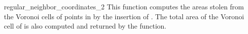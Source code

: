 \begin{ccRefFunction}{regular_neighbor_coordinates_2}
\ccImplementation This function computes the areas stolen from the
Voronoi cells of points in  by the insertion of . The
total area of the Voronoi cell of  is also computed and
returned by the function.

\ccSeeAlso
{} \\

\end{ccRefFunction}


